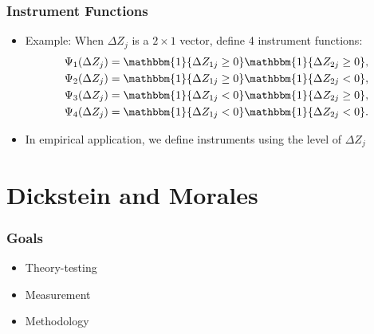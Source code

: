 \begin{frame}
\frametitle{Instrument Functions}

\begin{itemize}
\item Example: When $\Delta Z_{j}$ is a $2\times 1$ vector, define 4
instrument functions:  
\begin{align*}
\Psi_{1}(\Delta Z_{j})&=\mathbbm{1}\{\Delta Z_{1j}\geq0\}\mathbbm{1}\{\Delta
Z_{2j}\geq0\}, \\
\Psi_{2}(\Delta Z_{j})&=\mathbbm{1}\{\Delta Z_{1j}\geq0\}\mathbbm{1}\{\Delta
Z_{2j}<0\}, \\
\Psi_{3}(\Delta Z_{j})&=\mathbbm{1}\{\Delta Z_{1j}<0\}\mathbbm{1}\{\Delta
Z_{2j}\geq0\}, \\
\Psi_{4}(\Delta Z_{j})&=\mathbbm{1}\{\Delta Z_{1j}<0\}\mathbbm{1}\{\Delta
Z_{2j}<0\}.
\end{align*}

\item In empirical application, we define instruments using the level of $%
\Delta Z_{j}$
\end{itemize}
\end{frame}




\section{Dickstein and Morales}

\begin{frame}
\frametitle{Goals}

\begin{itemize}
\item Theory-testing
\item Measurement
\item Methodology
\end{itemize}

\end{frame}


